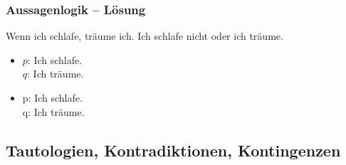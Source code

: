 \begin{frame}
\frametitle{Aussagenlogik -- Lösung}

\begin{exe}
	 Wenn ich schlafe, träume ich.
	 Ich schlafe nicht oder ich träume.
\end{exe}


\begin{minipage}{0.48\textwidth}
\centering
\begin{itemize}
	\item[] \small{$p$: Ich schlafe.\\
	$q$: Ich träume.}
\end{itemize}

\end{minipage}
\begin{minipage}{0.48\textwidth}
\centering
\begin{itemize}
	\item[] \small{p: Ich schlafe.\\
	q: Ich träume.}
\end{itemize}

\end{minipage}

\end{frame}


%
\subsection{Tautologien, Kontradiktionen, Kontingenzen}

